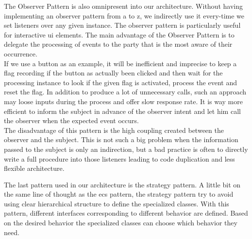 The Observer Pattern is also omnipresent into our architecture. Without having implementing an observer pattern from a to z, we indirectly use it every-time we set listeners over any given instance. The observer pattern is particularly useful for interactive \gls{ui} elements. The main advantage of the Observer Pattern is to delegate the processing of events to the party that is the most aware of their occurrence. \\

If we use a button as an example, it will be inefficient and imprecise to keep a flag recording if the button as actually been clicked and then wait for the processing instance to look if the given flag is activated, process the event and reset the flag. In addition to produce a lot of unnecessary calls, such an approach may loose inputs during the process and offer slow response rate. It is way more efficient to inform the subject in advance of the observer intent and let him call the observer when the expected event occurs. \\

The disadvantage of this pattern is the high coupling created between the observer and the subject. This is not such a big problem when the information passed to the subject is only an indirection, but a bad practice is often to directly write a full procedure into those listeners leading to code duplication and less flexible architecture. \cite{wiki:observer}

The last pattern used in our architecture is the strategy pattern. A little bit on the same line of thought as the \gls{ecs} pattern, the strategy pattern try to avoid using clear hierarchical structure to define the specialized classes. With this pattern, different interfaces corresponding to different behavior are defined. Based on the desired behavior the specialized classes can choose which behavior they need. \cite{wiki:strategy} \\
